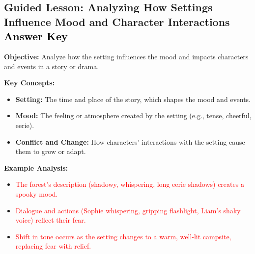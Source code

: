 \documentclass[12pt]{article}
\title{}
\date{}
\begin{document}
\subsection*{Guided Lesson: Analyzing How Settings Influence Mood and Character Interactions \textcolor{black}{Answer Key}}
\onehalfspacing

\begin{tcolorbox}[colframe=black!40, colback=gray!5, 
coltitle=black, colbacktitle=black!20, fonttitle=\bfseries\Large, 
title=Learning Objective, halign title=center, left=5pt, right=5pt, top=5pt, bottom=15pt]
\textbf{Objective:} Analyze how the setting influences the mood and impacts characters and events in a story or drama.
\end{tcolorbox}

\vspace{1em}

\begin{tcolorbox}[colframe=black!60, colback=white, 
coltitle=black, colbacktitle=black!15, fonttitle=\bfseries\Large, 
title=Key Concepts and Vocabulary, halign title=center, left=10pt, right=10pt, top=10pt, bottom=15pt]
\textbf{Key Concepts:}
\begin{itemize}
    \item \textbf{Setting:} The time and place of the story, which shapes the mood and events.
    \item \textbf{Mood:} The feeling or atmosphere created by the setting (e.g., tense, cheerful, eerie).
    \item \textbf{Conflict and Change:} How characters’ interactions with the setting cause them to grow or adapt.
\end{itemize}
\end{tcolorbox}

\vspace{1em}

\begin{tcolorbox}[colframe=black!60, colback=white, 
coltitle=black, colbacktitle=black!15, fonttitle=\bfseries\Large, 
title=Text 1: The Whispering Forest, halign title=center, left=10pt, right=10pt, bottom=15pt]

\textbf{Example Analysis:}
\begin{itemize}
    \item \textcolor{red}{The forest's description (shadowy, whispering, long eerie shadows) creates a spooky mood.}
    \item \textcolor{red}{Dialogue and actions (Sophie whispering, gripping flashlight, Liam’s shaky voice) reflect their fear.}
    \item \textcolor{red}{Shift in tone occurs as the setting changes to a warm, well-lit campsite, replacing fear with relief.}
\end{itemize}

\end{tcolorbox}
\end{document}
